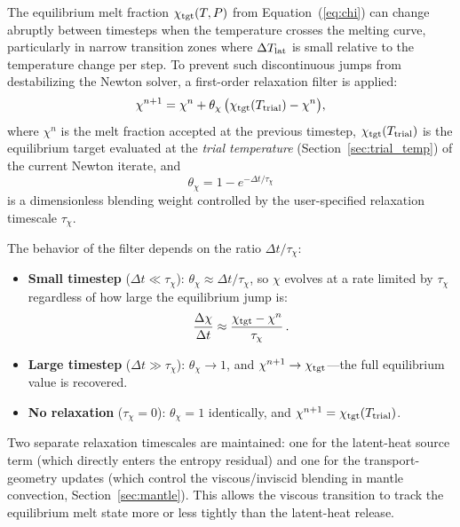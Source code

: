 \documentclass{aastex631}
\begin{document}
The equilibrium melt fraction $\chi_{\rm tgt}(T,P)$ from
Equation~(\ref{eq:chi}) can change abruptly between timesteps when the
temperature crosses the melting curve, particularly in narrow transition
zones where $\Delta T_{\rm lat}$ is small relative to the temperature
change per step.  To prevent such discontinuous jumps from
destabilizing the Newton solver, a first-order relaxation filter is
applied:
\begin{equation}\label{eq:chi_relax}
  \chi^{n+1}
  = \chi^n + \theta_\chi\,\bigl(\chi_{\rm tgt}(T_{\rm trial}) - \chi^n\bigr),
\end{equation}
where $\chi^n$ is the melt fraction accepted at the previous timestep,
$\chi_{\rm tgt}(T_{\rm trial})$ is the equilibrium target evaluated at
the \emph{trial temperature} (Section~\ref{sec:trial_temp}) of the
current Newton iterate, and
\begin{equation}\label{eq:theta_chi}
  \theta_\chi = 1 - e^{-\Delta t/\tau_\chi}
\end{equation}
is a dimensionless blending weight controlled by the user-specified
relaxation timescale $\tau_\chi$.

The behavior of the filter depends on the ratio $\Delta t/\tau_\chi$:
\begin{itemize}
  \item \textbf{Small timestep} ($\Delta t \ll \tau_\chi$):
    $\theta_\chi \approx \Delta t/\tau_\chi$, so $\chi$ evolves at a
    rate limited by $\tau_\chi$ regardless of how large the
    equilibrium jump is:
    \begin{equation}\label{eq:dchidt_limit}
      \frac{\Delta\chi}{\Delta t}
      \approx \frac{\chi_{\rm tgt} - \chi^n}{\tau_\chi}\,.
    \end{equation}
  \item \textbf{Large timestep} ($\Delta t \gg \tau_\chi$):
    $\theta_\chi \to 1$, and $\chi^{n+1} \to \chi_{\rm tgt}$---the
    full equilibrium value is recovered.
  \item \textbf{No relaxation} ($\tau_\chi = 0$):
    $\theta_\chi = 1$ identically, and
    $\chi^{n+1} = \chi_{\rm tgt}(T_{\rm trial})$.
\end{itemize}

Two separate relaxation timescales are maintained: one for the
latent-heat source term (which directly enters the entropy residual)
and one for the transport-geometry updates (which control the
viscous/inviscid blending in mantle convection,
Section~\ref{sec:mantle}).  This allows the viscous transition to
track the equilibrium melt state more or less tightly than the
latent-heat release.
\end{document}
